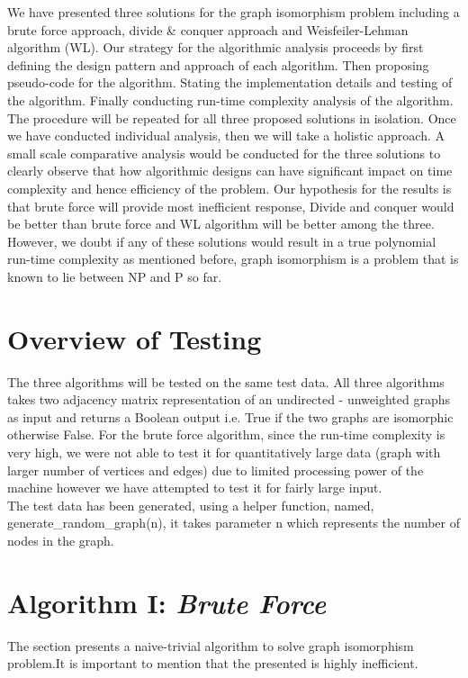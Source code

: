 \documentclass[11pt]{article}
\begin{document}
We have presented three solutions for the graph isomorphism problem including a brute force approach, divide \& conquer approach and Weisfeiler-Lehman algorithm (WL). Our strategy for the algorithmic analysis proceeds by first defining the design pattern and approach of each algorithm. Then proposing pseudo-code for the algorithm. Stating the implementation details and testing of the algorithm. Finally conducting run-time complexity analysis of the algorithm. The procedure will be repeated for all three proposed solutions in isolation. Once we have conducted individual analysis, then we will take a holistic approach. A small scale comparative analysis would be conducted for the three solutions to clearly observe that how algorithmic designs can have significant impact on time complexity and hence efficiency of the problem. Our hypothesis for the results is that brute force will provide most inefficient response, Divide and conquer would be better than brute force and WL algorithm will be better among the three. However, we doubt if any of these solutions would result in a true polynomial run-time complexity as mentioned before, graph isomorphism is a problem that is known to lie between NP and P so far. 
\section{Overview of Testing}
The three algorithms will be tested on the same test data. All three algorithms takes two adjacency matrix representation of an undirected - unweighted graphs as input and returns a Boolean output i.e. True if the two graphs are isomorphic otherwise False. For the brute force algorithm, since the run-time complexity is very high, we were not able to test it for quantitatively large data (graph with larger number of vertices and edges) due to limited processing power of the machine however we have attempted to test it for fairly large input. \\
The test data has been generated, using a helper function, named, generate\_random\_graph(n), it takes parameter n which represents the number of nodes in the graph.
\section{Algorithm I: \textit{Brute Force}}
The section presents a naive-trivial algorithm to solve graph isomorphism \cite{bruteGI} problem.It is important to mention that the presented is highly inefficient.
\end{document}
